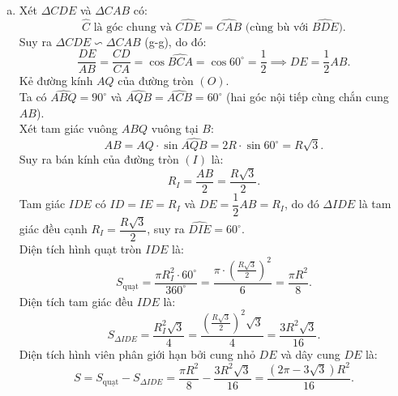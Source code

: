 \begin{bt}
{\begin{enumerate}[a)]
		Vậy ba điểm $H, I, K$ thẳng hàng.
		\item Xét $\Delta CDE$ và $\Delta CAB$ có:
		$$\widehat{C}\text{ là góc chung và } \widehat{CDE} = \widehat{CAB}\text{ (cùng bù với } \widehat{BDE}\text{)}.$$
		Suy ra $\Delta CDE \backsim \Delta CAB$ (g-g), do đó:
		$$\frac{DE}{AB} = \frac{CD}{CA} = \cos \widehat{BCA} = \cos 60^\circ = \frac{1}{2} \implies DE = \frac{1}{2}AB.$$
		Kẻ đường kính $AQ$ của đường tròn $(O)$.\\
		Ta có $\widehat{ABQ} = 90^\circ$ và $\widehat{AQB} = \widehat{ACB} = 60^\circ$ (hai góc nội tiếp cùng chắn cung $AB$).\\
		Xét tam giác vuông $ABQ$ vuông tại $B$:
		$$AB = AQ \cdot \sin \widehat{AQB} = 2R \cdot \sin 60^\circ = R\sqrt{3}.$$
		Suy ra bán kính của đường tròn $(I)$ là:
		$$R_I = \frac{AB}{2} = \frac{R\sqrt{3}}{2}.$$
		Tam giác $IDE$ có $ID = IE = R_I$ và $DE = \dfrac{1}{2}AB = R_I$, do đó $\Delta IDE$ là tam giác đều cạnh $R_I = \dfrac{R\sqrt{3}}{2}$, suy ra $\widehat{DIE} = 60^\circ$.\\
		Diện tích hình quạt tròn $IDE$ là:
		$$S_{\text{quạt}} = \frac{\pi R_I^2 \cdot 60^\circ}{360^\circ} = \frac{\pi \cdot \left(\frac{R\sqrt{3}}{2}\right)^2}{6} = \frac{\pi R^2}{8}.$$
		Diện tích tam giác đều $IDE$ là:
		$$S_{\Delta IDE} = \frac{R_I^2 \sqrt{3}}{4} = \frac{\left(\frac{R\sqrt{3}}{2}\right)^2 \sqrt{3}}{4} = \frac{3R^2\sqrt{3}}{16}.$$
		Diện tích hình viên phân giới hạn bởi cung nhỏ $DE$ và dây cung $DE$ là:
		$$S = S_{\text{quạt}} - S_{\Delta IDE} = \frac{\pi R^2}{8} - \frac{3R^2\sqrt{3}}{16} = \frac{(2\pi - 3\sqrt{3})R^2}{16}.$$
	\end{enumerate}
}
\end{bt}


